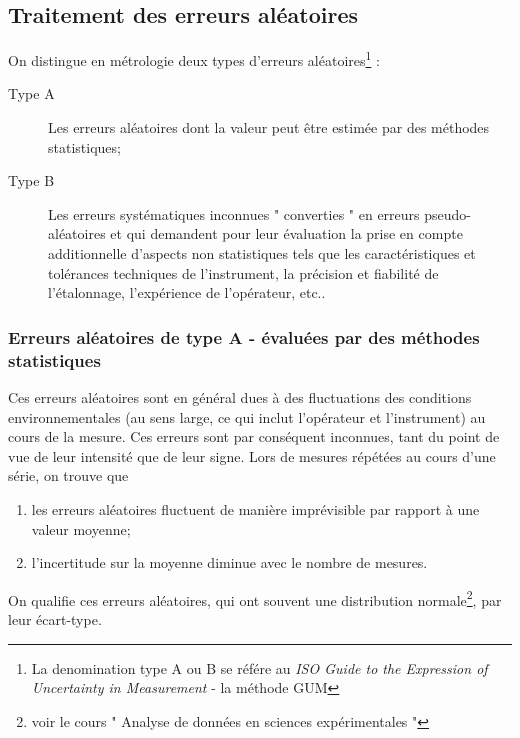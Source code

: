 \subsection{Traitement des erreurs aléatoires}

On distingue en métrologie deux types d'erreurs aléatoires\footnote{La denomination type A ou B se référe au \textit{ISO Guide to the Expression of Uncertainty in Measurement} - la méthode GUM} :
\begin{description}
\item[Type A] Les erreurs aléatoires dont la valeur peut être estimée par des méthodes statistiques;
\item[Type B] Les erreurs systématiques inconnues " converties " en erreurs pseudo-aléatoires et qui demandent pour leur évaluation la prise en compte additionnelle d'aspects non statistiques tels que les caractéristiques et tolérances techniques de l'instrument, la précision et fiabilité de l'étalonnage, l'expérience de l'opérateur, etc..
\end{description}

\subsubsection{Erreurs aléatoires de type A - évaluées par des méthodes statistiques}

Ces erreurs aléatoires sont en général dues à des fluctuations des conditions environnementales (au sens large, ce qui inclut l'opérateur et l'instrument) au cours de la mesure. Ces erreurs sont par conséquent inconnues, tant du point de vue de leur intensité que de leur signe. Lors de mesures répétées au cours d'une série, on trouve que
\begin{enumerate}
\item les  erreurs aléatoires fluctuent de manière imprévisible par rapport à une valeur moyenne;
\item l'incertitude sur la moyenne diminue avec le nombre de mesures.
\end{enumerate}

On qualifie ces erreurs aléatoires, qui ont souvent une distribution normale\footnote{voir le cours " Analyse de données en sciences expérimentales "}, par leur écart-type.

